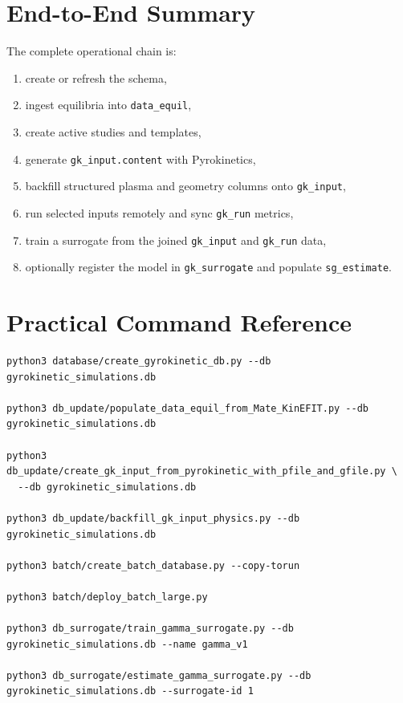 \documentclass[11pt]{article}
\newcommand{\code}[1]{\texttt{#1}}
\begin{document}
\section{End-to-End Summary}

The complete operational chain is:

\begin{enumerate}
\item create or refresh the schema,
\item ingest equilibria into \code{data\_equil},
\item create active studies and templates,
\item generate \code{gk\_input.content} with Pyrokinetics,
\item backfill structured plasma and geometry columns onto \code{gk\_input},
\item run selected inputs remotely and sync \code{gk\_run} metrics,
\item train a surrogate from the joined \code{gk\_input} and \code{gk\_run} data,
\item optionally register the model in \code{gk\_surrogate} and populate
\code{sg\_estimate}.
\end{enumerate}

\section{Practical Command Reference}

\begin{verbatim}
python3 database/create_gyrokinetic_db.py --db gyrokinetic_simulations.db

python3 db_update/populate_data_equil_from_Mate_KinEFIT.py --db gyrokinetic_simulations.db

python3 db_update/create_gk_input_from_pyrokinetic_with_pfile_and_gfile.py \
  --db gyrokinetic_simulations.db

python3 db_update/backfill_gk_input_physics.py --db gyrokinetic_simulations.db

python3 batch/create_batch_database.py --copy-torun

python3 batch/deploy_batch_large.py

python3 db_surrogate/train_gamma_surrogate.py --db gyrokinetic_simulations.db --name gamma_v1

python3 db_surrogate/estimate_gamma_surrogate.py --db gyrokinetic_simulations.db --surrogate-id 1
\end{verbatim}
\end{document}
